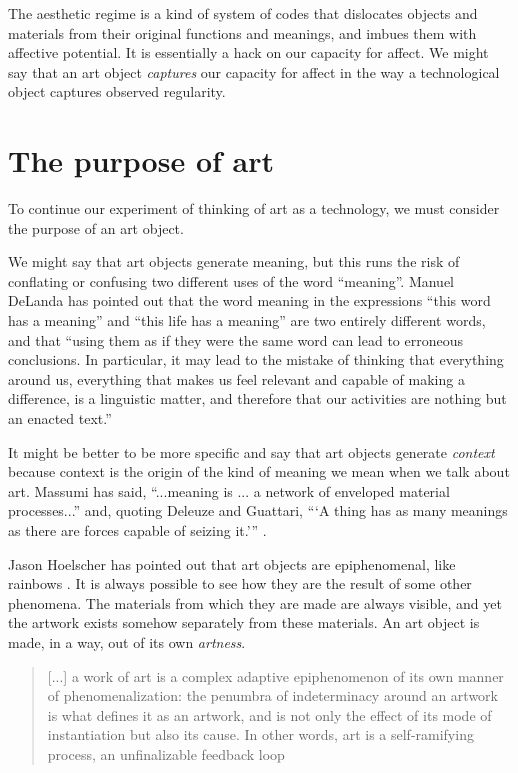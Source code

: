 \documentclass[letterpaper]{article}
\begin{document}
    The aesthetic regime is a kind of system of codes that dislocates objects and materials from their original functions and meanings, and imbues them with affective potential. It is essentially a hack on our capacity for affect. We might say that an art object \emph{captures} our capacity for affect in the way a technological object captures observed regularity.
    
\section{The purpose of art}

    To continue our experiment of thinking of art as a technology, we must consider the purpose of an art object.
    
    We might say that art objects generate meaning, but this runs the risk of conflating or confusing two different uses of the word “meaning”. Manuel DeLanda has pointed out that the word meaning in the expressions “this word has a meaning” and “this life has a meaning” are two entirely different words, and that “using them as if they were the same word can lead to erroneous conclusions. In particular, it may lead to the mistake of thinking that everything around us, everything that makes us feel relevant and capable of making a difference, is a linguistic matter, and therefore that our activities are nothing but an enacted text.” \citep[pp.40-41]{DeLandaCsltyAndMnng2018}
    
    It might be better to be more specific and say that art objects generate \emph{context} because context is the origin of the kind of meaning we mean when we talk about art. Massumi has said, “...meaning is ... a network of enveloped material processes...” and, quoting Deleuze and Guattari, “‘A thing has as many meanings as there are forces capable of seizing it.’” \citep[p.10]{MassumiAUsrsGdTCptlsmAndSchzphrn1992}.

    Jason Hoelscher has pointed out that art objects are epiphenomenal, like rainbows \citep[p.17]{HoelscherArtAsInfrmtn2021}. It is always possible to see how they are the result of some other phenomena. The materials from which they are made are always visible, and yet the artwork exists somehow separately from these materials. An art object is made, in a way, out of its own \emph{artness}.
    
    \begin{quote}
        [...] a work of art is a complex adaptive epiphenomenon of its own manner of phenomenalization: the penumbra of indeterminacy around an artwork is what defines it as an artwork, and is not only the effect of its mode of instantiation but also its cause. In other words, art is a self-ramifying process, an unfinalizable feedback loop \citep[p.2]{HoelscherThPtcsOfPhsSpc2014}
    \end{quote}
\end{document}
